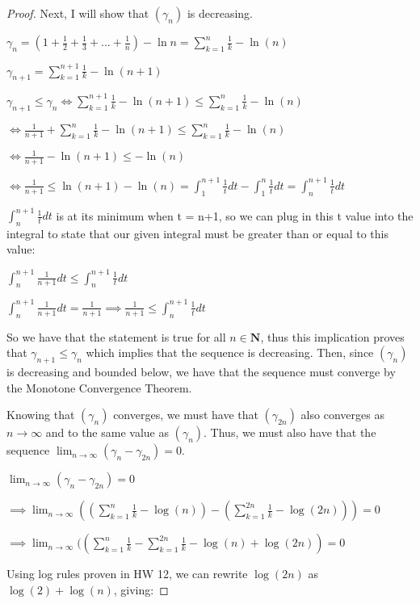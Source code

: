 \documentclass{article}
\begin{document}
\begin{proof}
Next, I will show that $(\gamma_n)$ is decreasing. 

$\gamma_n = (1 + \frac{1}{2} + \frac{1}{3} + ... + \frac{1}{n}) - \ln{n} = \sum_{k=1}^{n} \frac{1}{k} - \ln{(n)}$

$\gamma_{n+1} = \sum_{k=1}^{n+1} \frac{1}{k} - \ln{(n+1)}$

$\gamma_{n+1} \leq \gamma_n \iff \sum_{k=1}^{n+1} \frac{1}{k} - \ln{(n+1)} \leq   \sum_{k=1}^{n} \frac{1}{k} - \ln{(n)}$

$\iff \frac{1}{n+1} + \sum_{k=1}^{n} \frac{1}{k} - \ln{(n+1)} \leq \sum_{k=1}^{n} \frac{1}{k} - \ln{(n)}$

$\iff \frac{1}{n+1} - \ln{(n+1)} \leq - \ln{(n)}$

$\iff \frac{1}{n+1} \leq \ln{(n+1)} - \ln{(n)} =  \int_{1}^{n+1} \frac{1}{t} dt - \int_{1}^{n} \frac{1}{t} dt = \int_{n}^{n+1} \frac{1}{t} dt$

$\int_{n}^{n+1} \frac{1}{t} dt$ is at its minimum when t = n+1, so we can plug in this t value into the integral to state that our given integral must be greater than or equal to this value:

$\int_{n}^{n+1} \frac{1}{n+1} dt \leq \int_{n}^{n+1} \frac{1}{t} dt$

$\int_{n}^{n+1} \frac{1}{n+1} dt = \frac{1}{n+1} \implies \frac{1}{n+1} \leq \int_{n}^{n+1} \frac{1}{t} dt$

So we have that the statement is true for all $n \in \mathbf{N}$, thus this implication proves that $\gamma_{n+1} \leq \gamma_n$ which implies that the sequence is decreasing. Then, since $(\gamma_n)$ is decreasing and bounded below, we have that the sequence must converge by the Monotone Convergence Theorem.


Knowing that $(\gamma_n)$ converges, we must have that $(\gamma_{2n})$ also converges as $n \rightarrow \infty$ and to the same value as $(\gamma_n)$. Thus, we must also have that the sequence $\lim_{n \rightarrow \infty} (\gamma_n - \gamma_{2n}) = 0$.

$\lim_{n \rightarrow \infty} (\gamma_n - \gamma_{2n}) = 0$

$\implies \lim_{n \rightarrow \infty} ((\sum_{k=1}^{n} \frac{1}{k} - \log(n)) - (\sum_{k=1}^{2n} \frac{1}{k} - \log(2n))) = 0$

$\implies \lim_{n \rightarrow \infty} ((\sum_{k=1}^{n} \frac{1}{k} - \sum_{k=1}^{2n} \frac{1}{k} - \log(n) + \log(2n)) = 0$

Using log rules proven in HW 12, we can rewrite $\log(2n)$ as $\log(2) + \log(n)$, giving: 


\end{proof}
\end{document}

